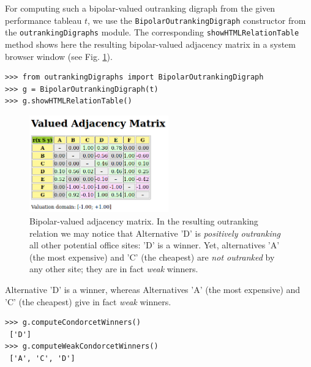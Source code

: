 For computing such a bipolar-valued outranking digraph from the given performance tableau $t$, we use the \texttt{BipolarOutrankingDigraph} constructor from the \texttt{outrankingDigraphs} module. The corresponding \texttt{showHTMLRelationTable} method shows here the resulting bipolar-valued adjacency matrix in a system browser window (see Fig. \ref{fig:6.2}).
\begin{lstlisting}
>>> from outrankingDigraphs import BipolarOutrankingDigraph
>>> g = BipolarOutrankingDigraph(t)
>>> g.showHTMLRelationTable()
\end{lstlisting}
\begin{figure}[h]
\sidecaption[t]
\includegraphics[width=6cm]{Figures/officeChoiceOutranking.png}
\caption{Bipolar-valued adjacency matrix. In the resulting outranking relation we may notice that Alternative 'D' is \emph{positively outranking} all other potential office sites: 'D' is a \Condorcet winner. Yet, alternatives 'A' (the most expensive) and 'C' (the cheapest) are \emph{not outranked} by any other site; they are in fact \emph{weak} \Condorcet winners.}
\label{fig:6.2}       %
\end{figure}
Alternative 'D' is a \Condorcet winner, whereas Alternatives 'A' (the most expensive) and 'C' (the cheapest) give in fact \emph{weak} \Condorcet winners.
\begin{lstlisting}
>>> g.computeCondorcetWinners()
 ['D']
>>> g.computeWeakCondorcetWinners()
 ['A', 'C', 'D']
\end{lstlisting}

